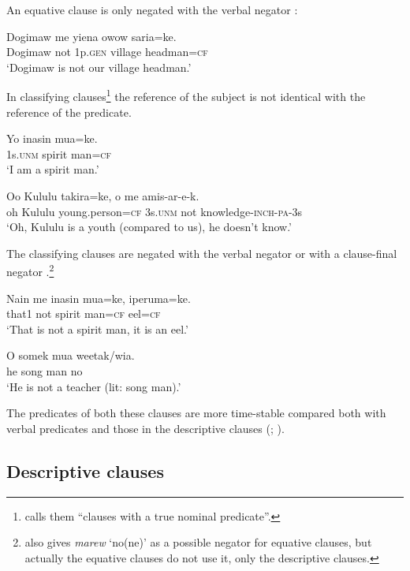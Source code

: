 An equative clause is only negated with the verbal negator :

\ea%
\label{ex:5:x1752}
\gll Dogimaw  me  yiena  owow  saria=ke. \\
     Dogimaw  not  1p.\textsc{gen}  village  headman=\textsc{cf} \\
\glt `Dogimaw is not our village headman.'
\z

In classifying clauses\footnote{\citet[233]{Dryer2007b} calls them ``clauses with a true nominal predicate''.} the reference of the subject is not identical with the reference of the predicate.

\ea%
\label{ex:5:x977}
\gll Yo  inasin  mua=ke. \\
     1s.\textsc{unm}  spirit  man=\textsc{cf} \\
\glt `I am a spirit man.'
\z

\ea%
\label{ex:5:x978}
\gll Oo  Kululu  takira=ke,  o  me  amis-ar-e-k. \\
     oh  Kululu  young.person=\textsc{cf}  3s.\textsc{unm}  not  knowledge-\textsc{inch}-\textsc{pa}-3s \\
\glt `Oh, Kululu is a youth (compared to us), he doesn't know.'
\z

The classifying clauses are negated with the verbal negator  or with a clause-final negator .\footnote{\citet[272]{Berghall2006} also gives \textit{marew} `no(ne)' as a possible negator for equative clauses, but actually the equative clauses do not use it, only the descriptive clauses.} 

\ea%
\label{ex:5:x980}
\gll Nain  me  inasin  mua=ke,  iperuma=ke. \\
     that1  not  spirit  man=\textsc{cf}  eel=\textsc{cf} \\
\glt `That is not a spirit man, it is an eel.'
\z

\ea%
\label{ex:5:x984}
\gll O  somek  mua  weetak/wia. \\
     he  song  man  no \\
\glt `He is not a teacher (lit: song man).' 
\z

The predicates of both these clauses are more time-stable compared both with verbal predicates and those in the descriptive clauses (\citealt[51]{Givon1984}; \citealt[16]{Stassen1997}). 

\subsection{Descriptive clauses}

